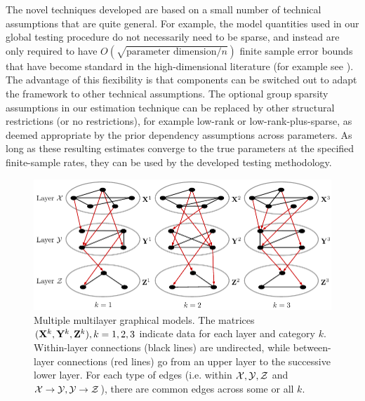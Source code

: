 The novel techniques developed are based on a small number of technical assumptions that are quite general. For example, the model quantities used in our global testing procedure do not necessarily need to be sparse, and instead are only required to have $O(\sqrt{ \text{parameter dimension}/n})$ finite sample error bounds that have become standard in the high-dimensional literature (for example see \citet{LohWainwright12, BasuMichailidis15, BasuEtal19}). The advantage of this %
fiexibility is that components can be switched out to adapt the framework to other technical assumptions. The optional group sparsity assumptions in our estimation technique can be replaced by other structural restrictions (or no restrictions), for example low-rank or low-rank-plus-sparse, as deemed appropriate by the prior dependency assumptions across parameters. As long as these resulting estimates converge to the true parameters at the specified finite-sample rates, they can be used by the developed testing methodology.
%
\begin{figure}
\centering
\includegraphics[]{multi2layer}
\caption{Multiple multilayer graphical models. The matrices $({\mathbf{X}}^k, {\mathbf{Y}}^k, {\mathbf{Z}}^k), k = 1,2,3$ indicate data for each layer and category $k$. Within-layer connections (black lines) are undirected, while between-layer connections (red lines) go from an upper layer to the successive lower layer. For each type of edges (i.e. within ${\cal{X}}, {\cal{Y}}, {\cal{Z}}$ and ${\cal{X}} \rightarrow {\cal{Y}}, {\cal{Y}} \rightarrow {\cal{Z}}$), there are common edges across some or all $k$. }
\label{fig:multi2layer}
\end{figure}

